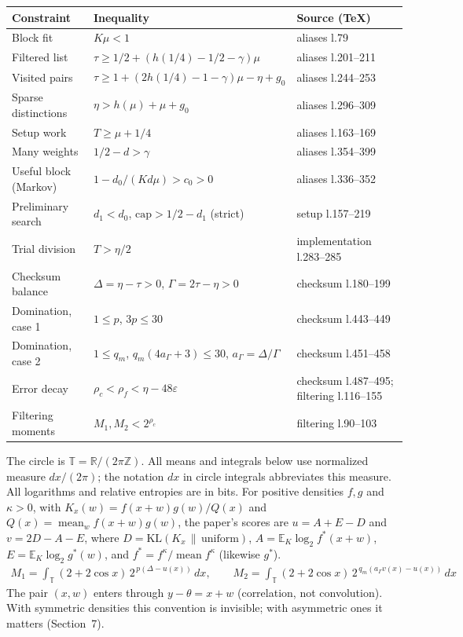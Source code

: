 \documentclass[11pt]{article}
\DeclareMathOperator{\mean}{mean}
\newcommand{\E}{\mathbb{E}}
\newcommand{\eps}{\varepsilon}
\newcommand{\KL}{\mathrm{KL}}
\theoremstyle{plain}
\begin{document}
\begin{center}
\small
\begin{tabularx}{\linewidth}{>{\raggedright\arraybackslash}p{3.2cm} L >{\raggedright\arraybackslash}p{3.6cm}}
\toprule
Constraint & Inequality & Source (TeX) \\
\midrule
Block fit & $K\mu < 1$ & aliases l.79 \\
Filtered list & $\tau \ge 1/2 + (h(1/4) - 1/2 - \gamma)\mu$ & aliases l.201--211 \\
Visited pairs & $\tau \ge 1 + (2h(1/4) - 1 - \gamma)\mu - \eta + g_0$ & aliases l.244--253 \\
Sparse distinctions & $\eta > h(\mu) + \mu + g_0$ & aliases l.296--309 \\
Setup work & $T \ge \mu + 1/4$ & aliases l.163--169 \\
Many weights & $1/2 - d > \gamma$ & aliases l.354--399 \\
Useful block (Markov) & $1 - d_0/(K d \mu) > c_0 > 0$ & aliases l.336--352 \\
Preliminary search & $d_1 < d_0$, $\mathrm{cap} > 1/2 - d_1$ (strict) & setup l.157--219 \\
Trial division & $T > \eta/2$ & implementation l.283--285 \\
Checksum balance & $\Delta = \eta - \tau > 0$, $\Gamma = 2\tau - \eta > 0$ & checksum l.180--199 \\
Domination, case 1 & $1 \le p$, $3p \le 30$ & checksum l.443--449 \\
Domination, case 2 & $1 \le q_m$, $q_m(4a_\Gamma + 3) \le 30$, $a_\Gamma = \Delta/\Gamma$ & checksum l.451--458 \\
Error decay & $\rho_c < \rho_f < \eta - 48\eps$ & checksum l.487--495; filtering l.116--155 \\
Filtering moments & $M_1, M_2 < 2^{\rho_c}$ & filtering l.90--103 \\
\bottomrule
\end{tabularx}
\end{center}

The circle is $\mathbb T=\mathbb R/(2\pi\mathbb Z)$. All means and integrals below use normalized measure $dx/(2\pi)$; the notation $dx$ in circle integrals abbreviates this measure. All logarithms and relative entropies are in bits. For positive densities $f, g$ and $\kappa > 0$, with $K_x(w) = f(x+w)g(w)/Q(x)$ and $Q(x) = \mean_w f(x+w)g(w)$, the paper's scores are $u = A + E - D$ and $v = 2D - A - E$, where $D = \KL(K_x \,\|\, \mathrm{uniform})$, $A = \E_K \log_2 f^*(x+w)$, $E = \E_K \log_2 g^*(w)$, and $f^* = f^\kappa / \mean f^\kappa$ (likewise $g^*$).
\begin{gather*}
M_1 = \int_{\mathbb T} (2+2\cos x)\, 2^{\,p(\Delta - u(x))}\, dx, \qquad M_2 = \int_{\mathbb T} (2+2\cos x)\, 2^{\,q_m(a_\Gamma v(x) - u(x))}\, dx
\end{gather*}
The pair $(x, w)$ enters through $y - \theta = x + w$ (correlation, not convolution). With symmetric densities this convention is invisible; with asymmetric ones it matters (Section~7).
\end{document}
